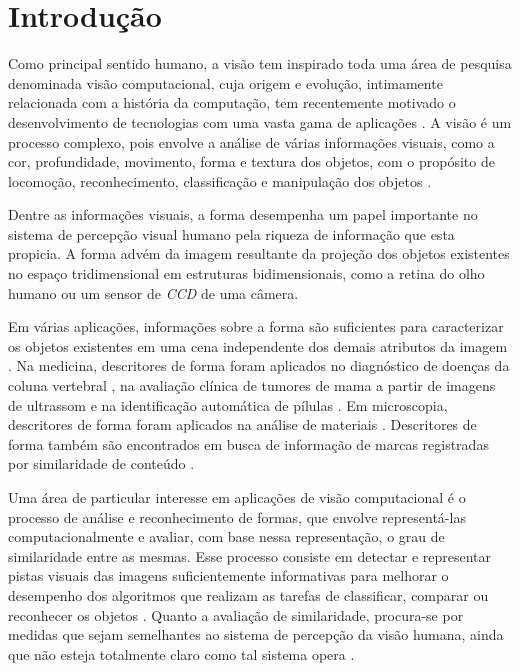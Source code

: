 
\chapter{Introdução \label{chap:INTRO}}


Como principal sentido humano, a visão tem inspirado toda uma área de pesquisa denominada visão computacional, cuja origem e evolução, intimamente relacionada com a história da computação, tem recentemente motivado o desenvolvimento de tecnologias com uma vasta gama de aplicações \cite{Costa:2009}. A visão é um processo complexo, pois envolve a análise de várias informações visuais, como a cor, profundidade, movimento, forma e textura dos objetos, com o propósito de locomoção, reconhecimento, classificação e manipulação dos objetos \cite{Ullman:1996}.

Dentre as informações visuais, a forma desempenha um papel importante no sistema de percepção visual humano pela riqueza de informação que esta propicia. A forma advém da imagem resultante da projeção dos objetos existentes no espaço tridimensional em estruturas bidimensionais, como a retina do olho humano ou um sensor de \emph{CCD} de uma câmera.

Em várias aplicações, informações sobre a forma são suficientes para caracterizar os objetos existentes em uma cena independente dos demais atributos da imagem \cite{Zhang201661,deSouza2016,Zhao20153203}. Na medicina, descritores de forma foram aplicados no diagnóstico de doenças da coluna vertebral \cite{Lee:2009}, na avaliação clínica de tumores de mama a partir de imagens de ultrassom \cite{Yang:2009} e na identificação automática de pílulas \cite{Ushizima:2015}. Em microscopia, descritores de forma foram aplicados na análise de materiais \cite{Zhang201661}. Descritores de forma também são encontrados em busca de informação de marcas registradas por similaridade de conteúdo \cite{MohdAnuar2013105,Qi20102017}.

Uma área de particular interesse em aplicações de visão computacional é o processo de análise e reconhecimento de formas, que envolve representá-las computacionalmente e avaliar, com base nessa representação, o grau de similaridade entre as mesmas. Esse processo consiste em detectar e representar pistas visuais das imagens suficientemente informativas para melhorar o desempenho dos algoritmos que realizam as tarefas de classificar, comparar ou reconhecer os objetos \cite{Escolano:2009}. Quanto a avaliação de similaridade, procura-se por medidas que sejam semelhantes ao sistema de percepção da visão humana, ainda que não esteja totalmente claro como tal sistema opera \cite{4815272}. 

